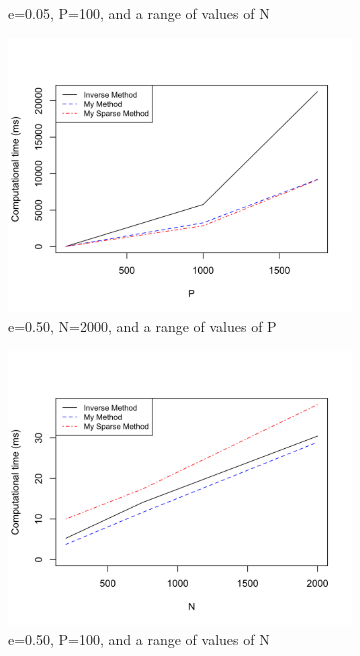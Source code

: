 \documentclass[11 pt]{article}
\begin{document}
\begin{enumerate}[label=(\Alph*)]
\begin{figure}[H]
\begin{center}
\begin{subfigure}[h]{0.45\linewidth}
			\caption{e=0.05, P=100, and a range of values of N}
		\end{subfigure}
			\begin{subfigure}[h]{0.45\linewidth}
		\includegraphics[width=\linewidth]{Ex01R/Fig/P1DPe05.png}
		\caption{e=0.50, N=2000, and a range of values of P}
	\end{subfigure}
		\begin{subfigure}[h]{0.45\linewidth}
	\includegraphics[width=\linewidth]{Ex01R/Fig/P1DNe05.png}
	\caption{e=0.50, P=100, and a range of values of N}
	\end{subfigure}
		\begin{subfigure}[h]{0.45\linewidth}

\end{subfigure}
\end{center}
\end{figure}
\end{enumerate}
\end{document}
